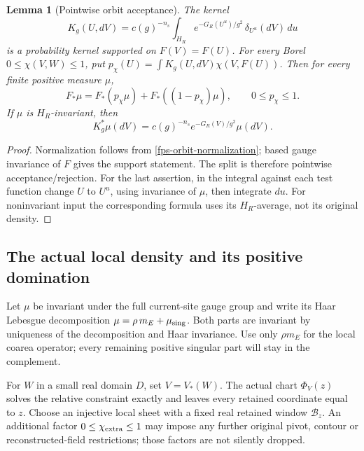\documentclass[11pt]{article}
\newtheorem{lemma}[theorem]{Lemma}
\theoremstyle{remark}
\begin{document}
\begin{lemma}[Pointwise orbit acceptance]
\label{fps-markov-lemma}
The kernel
\begin{equation}
 K_g(U,dV)=c(g)^{-n_s}\int_{H_R}
       e^{-G_R(U^u)/g^2}\,\delta_{U^u}(dV)\,du
 \label{fps-markov}
\end{equation}
is a probability kernel supported on \(F(V)=F(U)\).
For every Borel \(0\le\chi(V,W)\le1\), put
\(p_\chi(U)=\int K_g(U,dV)\chi(V,F(U))\). Then for every
finite positive measure \(\mu\),
\begin{equation}
 F_*\mu=F_*(p_\chi\mu)+F_*((1-p_\chi)\mu),\qquad
 0\le p_\chi\le1.
 \label{fps-markov-split}
\end{equation}
If \(\mu\) is \(H_R\)-invariant, then
\begin{equation}
 K_g^*\mu(dV)=c(g)^{-n_s}e^{-G_R(V)/g^2}\mu(dV).
 \label{fps-invariant-insertion}
\end{equation}
\end{lemma}
\begin{proof}
Normalization follows from \eqref{fps-orbit-normalization}; based gauge
invariance of \(F\) gives the support statement. The split is therefore
pointwise acceptance/rejection. For the last assertion, in the integral
against each test function change \(U\) to \(U^u\), using invariance of
\(\mu\), then integrate \(du\). For noninvariant input the corresponding
formula uses its \(H_R\)-average, not its original density.
\end{proof}

\subsection{The actual local density and its positive domination}
\label{fps-local-section}

Let \(\mu\) be invariant under the full current-site gauge group and
write its Haar Lebesgue decomposition
\(\mu=\rho\,m_E+\mu_{\rm sing}\). Both parts are invariant by uniqueness
of the decomposition and Haar invariance. Use only \(\rho m_E\) for the
local coarea operator; every remaining positive singular part will stay
in the complement.

For \(W\) in a small real domain \(D\), set \(V=V_*(W)\). The actual
chart \(\Phi_V(z)\) solves the relative constraint exactly and leaves
every retained coordinate equal to \(z\). Choose an injective local
sheet with a fixed real retained window \(\mathcal B_z\). An additional
factor \(0\le\chi_{\rm extra}\le1\) may impose any further original
pivot, contour or reconstructed-field restrictions; those factors are
not silently dropped.
\end{document}
